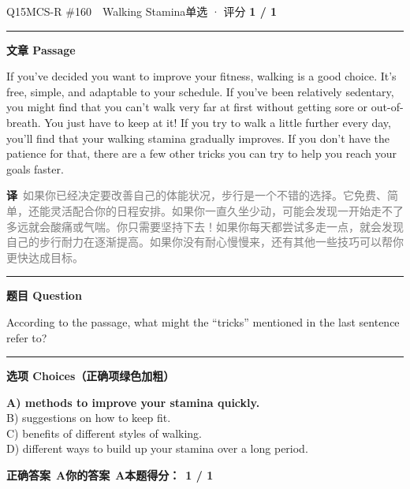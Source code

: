 \documentclass[11pt]{article}
\newcommand{\ptesub}[1]{%
  \par\needspace{2\baselineskip}\smallskip
  {\color{cAccent}\rule[-0.2ex]{3pt}{1.05em}}\hspace{6pt}%
  {\bfseries\color{cHead}#1}\par\nopagebreak\smallskip}
\newcommand{\zh}[1]{{\footnotesize\textcolor{cNote}{\textbf{译}}\ \textcolor{gray}{#1}}}
\begin{document}
\begin{qblock}{Q15\quad MCS-R \#160\ \ Walking Stamina}{单选 · 评分 \textcolor{cAccent}{\bfseries 1 / 1}}
\ptesub{文章 Passage}
\begin{promptbox}
If you've decided you want to improve your fitness, walking is a good choice. It's free, simple, and adaptable to your schedule. If you've been relatively sedentary, you might find that you can't walk very far at first without getting sore or out-of-breath. You just have to keep at it! If you try to walk a little further every day, you'll find that your walking stamina gradually improves. If you don't have the patience for that, there are a few other tricks you can try to help you reach your goals faster.
\end{promptbox}
\zh{如果你已经决定要改善自己的体能状况，步行是一个不错的选择。它免费、简单，还能灵活配合你的日程安排。如果你一直久坐少动，可能会发现一开始走不了多远就会酸痛或气喘。你只需要坚持下去！如果你每天都尝试多走一点，就会发现自己的步行耐力在逐渐提高。如果你没有耐心慢慢来，还有其他一些技巧可以帮你更快达成目标。}
\ptesub{题目 Question}
\begin{notebox}According to the passage, what might the ``tricks'' mentioned in the last sentence refer to?\end{notebox}
\ptesub{选项 Choices（正确项绿色加粗）}
{\small
{\color{cFix}\textbf{A) methods to improve your stamina quickly.}}\\
B) suggestions on how to keep fit.\\
C) benefits of different styles of walking.\\
D) different ways to build up your stamina over a long period.}
\par\smallskip
\textbf{正确答案}\ \textcolor{cFix}{\bfseries A}\qquad\textbf{你的答案}\ \textcolor{cFix}{\bfseries A}\qquad\textbf{本题得分：}\ {\color{cAccent}\bfseries 1 / 1}
\end{qblock}
\end{document}
